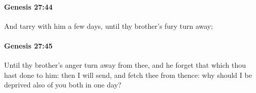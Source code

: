 		\paragraph{Genesis 27:44} %
			\label{GENESIS-27-44}

			And tarry with him a few days, until thy brother's fury turn away;


		\paragraph{Genesis 27:45} %
			\label{GENESIS-27-45}

			Until thy brother's anger turn away from thee, and he forget that which thou hast done to him: then I will send, and fetch thee from thence: why should I be deprived also of you both in one day?


